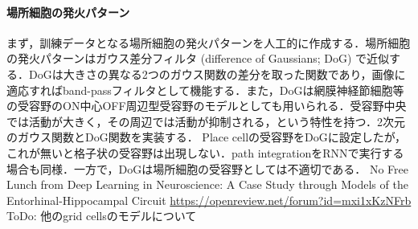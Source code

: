\paragraph{場所細胞の発火パターン}
まず，訓練データとなる場所細胞の発火パターンを人工的に作成する．場所細胞の発火パターンはガウス差分フィルタ (difference of Gaussians; DoG) で近似する．DoGは大きさの異なる2つのガウス関数の差分を取った関数であり，画像に適応すればband-passフィルタとして機能する．また，DoGは網膜神経節細胞等の受容野のON中心OFF周辺型受容野のモデルとしても用いられる．受容野中央では活動が大きく，その周辺では活動が抑制される，という特性を持つ．2次元のガウス関数とDoG関数を実装する．
Place cellの受容野をDoGに設定したが，これが無いと格子状の受容野は出現しない．path integrationをRNNで実行する場合も同様．一方で，DoGは場所細胞の受容野としては不適切である．
No Free Lunch from Deep Learning in Neuroscience: A Case Study through Models of the Entorhinal-Hippocampal Circuit 
\url{https://openreview.net/forum?id=mxi1xKzNFrb}
ToDo: 他のgrid cellsのモデルについて
